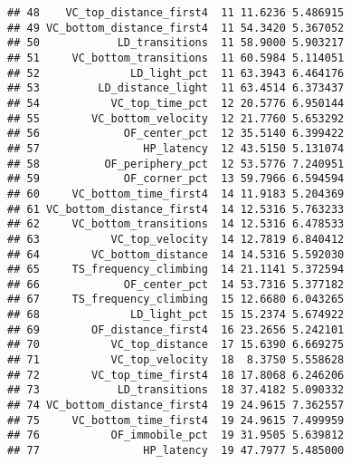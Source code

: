 \documentclass[oneside]{book}
\newenvironment{Shaded}{\begin{snugshade}}{\end{snugshade}}
\newcommand{\DecValTok}[1]{\textcolor[rgb]{0.00,0.00,0.81}{#1}}
\newcommand{\KeywordTok}[1]{\textcolor[rgb]{0.13,0.29,0.53}{\textbf{#1}}}
\newcommand{\NormalTok}[1]{#1}
\newcommand{\OperatorTok}[1]{\textcolor[rgb]{0.81,0.36,0.00}{\textbf{#1}}}
\newcommand{\StringTok}[1]{\textcolor[rgb]{0.31,0.60,0.02}{#1}}
\begin{document}
\begin{verbatim}
## 48    VC_top_distance_first4  11 11.6236 5.486915
## 49 VC_bottom_distance_first4  11 54.3420 5.367052
## 50            LD_transitions  11 58.9000 5.903217
## 51     VC_bottom_transitions  11 60.5984 5.114051
## 52              LD_light_pct  11 63.3943 6.464176
## 53         LD_distance_light  11 63.4514 6.373437
## 54           VC_top_time_pct  12 20.5776 6.950144
## 55        VC_bottom_velocity  12 21.7760 5.653292
## 56             OF_center_pct  12 35.5140 6.399422
## 57                HP_latency  12 43.5150 5.131074
## 58          OF_periphery_pct  12 53.5776 7.240951
## 59             OF_corner_pct  13 59.7966 6.594594
## 60     VC_bottom_time_first4  14 11.9183 5.204369
## 61 VC_bottom_distance_first4  14 12.5316 5.763233
## 62     VC_bottom_transitions  14 12.5316 6.478533
## 63           VC_top_velocity  14 12.7819 6.840412
## 64        VC_bottom_distance  14 14.5316 5.592030
## 65     TS_frequency_climbing  14 21.1141 5.372594
## 66             OF_center_pct  14 53.7316 5.377182
## 67     TS_frequency_climbing  15 12.6680 6.043265
## 68              LD_light_pct  15 15.2374 5.674922
## 69        OF_distance_first4  16 23.2656 5.242101
## 70           VC_top_distance  17 15.6390 6.669275
## 71           VC_top_velocity  18  8.3750 5.558628
## 72        VC_top_time_first4  18 17.8068 6.246206
## 73            LD_transitions  18 37.4182 5.090332
## 74 VC_bottom_distance_first4  19 24.9615 7.362557
## 75     VC_bottom_time_first4  19 24.9615 7.499959
## 76           OF_immobile_pct  19 31.9505 5.639812
## 77                HP_latency  19 47.7977 5.485000
\end{verbatim}

\begin{Shaded}
\end{Shaded}
\end{document}
